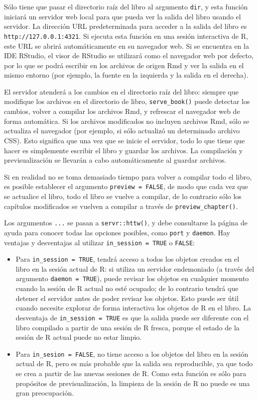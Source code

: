 \documentclass[12pt,]{krantz}
\theoremstyle{definition}
\theoremstyle{definition}
\theoremstyle{remark}
\begin{document}
Sólo tiene que pasar el directorio raíz del libro al argumento
\texttt{dir}, y esta función iniciará un servidor web local para que
pueda ver la salida del libro usando el servidor. La dirección URL
predeterminada para acceder a la salida del libro es
\texttt{http://127.0.0.1:4321}. Si ejecuta esta función en una sesión
interactiva de R, este URL se abrirá automáticamente en su navegador
web. Si se encuentra en la IDE RStudio, el visor de RStudio se utilizará
como el navegador web por defecto, por lo que se podrá escribir en los
archivos de origen Rmd y ver la salida en el mismo entorno (por ejemplo,
la fuente en la izquierda y la salida en el derecha).

El servidor atenderá a los cambios en el directorio raíz del libro:
siempre que modifique los archivos en el directorio de libro,
\texttt{serve\_book()} puede detectar los cambios, volver a compilar los
archivos Rmd, y refrescar el navegador web de forma automática. Si los
archivos modificados no incluyen archivos Rmd, sólo se actualiza el
navegador (por ejemplo, si sólo actualizó un determinado archivo CSS).
Esto significa que una vez que se inicie el servidor, todo lo que tiene
que hacer es simplemente escribir el libro y guardar los archivos. La
compilación y previsualización se llevarán a cabo automáticamente al
guardar archivos.

Si en realidad no se toma demasiado tiempo para volver a compilar todo
el libro, es posible establecer el argumento \texttt{preview\ =\ FALSE},
de modo que cada vez que se actualice el libro, todo el libro se vuelve
a compilar, de lo contrario sólo los capítulos modificados se vuelven a
compilar a través de \texttt{preview\_chapter()}.

Los argumentos \texttt{...} se pasan a \texttt{servr::httw()}, y debe
consultarse la página de ayuda para conocer todas las opciones posibles,
como \texttt{port} y \texttt{daemon}. Hay ventajas y desventajas al
utilizar \texttt{in\_session\ =\ TRUE} o \texttt{FALSE}:

\begin{itemize}
\item
  Para \texttt{in\_session\ =\ TRUE}, tendrá acceso a todos los objetos
  creados en el libro en la sesión actual de R: si utiliza un servidor
  endemoniado (a través del argumento \texttt{daemon\ =\ TRUE}), puede
  revisar los objetos en cualquier momento cuando la sesión de R actual
  no esté ocupado; de lo contrario tendrá que detener el servidor antes
  de poder revisar los objetos. Esto puede ser útil cuando necesite
  explorar de forma interactiva los objetos de R en el libro. La
  desventaja de \texttt{in\_session\ =\ TRUE} es que la salida puede ser
  diferente con el libro compilado a partir de una sesión de R fresca,
  porque el estado de la sesión de R actual puede no estar limpio.
\item
  Para \texttt{in\_sesion\ =\ FALSE}, no tiene acceso a los objetos del
  libro en la sesión actual de R, pero es más probable que la salida sea
  reproducible, ya que todo se crea a partir de las nuevas sesiones de
  R. Como esta función es sólo para propósitos de previsualización, la
  limpieza de la sesión de R no puede es una gran preocupación.
\end{itemize}
\end{document}
